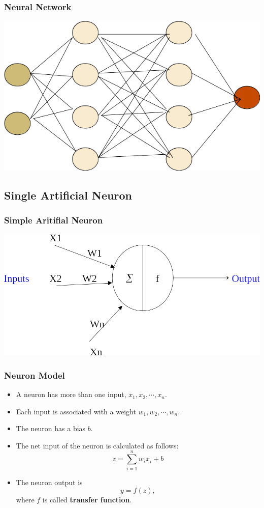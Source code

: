 \documentclass{beamer}
\begin{document}
\begin{frame}
    \frametitle{Neural Network}

    \includegraphics[width=\textwidth,height=\textheight,keepaspectratio]{assets/images/NN.png}
\end{frame}


\subsection{Single Artificial Neuron}

\begin{frame}
    \frametitle{Simple Aritifial Neuron}
    \includegraphics[width=\textwidth,height=\textheight,keepaspectratio]{assets/images/ANN.png}
\end{frame}


\begin{frame}
    \frametitle{Neuron Model}

    \begin{itemize}
        \item A neuron has more than one input, $x_1,x_2,\cdots, x_n$.
        \item Each input is associated with a weight $w_1,w_2,\cdots,w_n$.
        \item The neuron has a bias $b$.
        \item The net input of the neuron is calculated as follows:
        \begin{equation}
            z=\sum_{i=1}^n w_ix_i+b
        \end{equation}
        \item The neuron output is 
        \begin{equation}
            y=f(z),    
        \end{equation}
        where $f$ is called \textbf{transfer function}.
    \end{itemize}
\end{frame}
\end{document}

